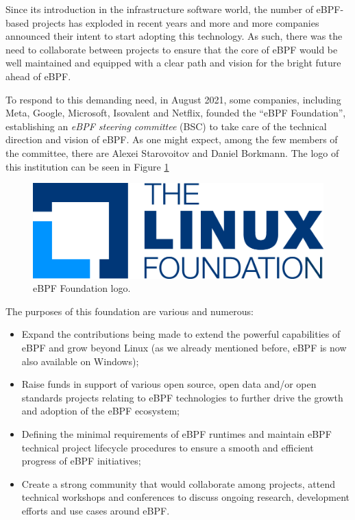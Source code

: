 Since its introduction in the infrastructure software world, the number of eBPF-based projects has exploded in recent years and more and more companies announced their intent to start adopting this technology.
As such, there was the need to collaborate between projects to ensure that the core of eBPF would be well maintained and equipped with a clear path and vision for the bright future ahead of eBPF.

To respond to this demanding need, in August 2021, some companies, including Meta, Google, Microsoft, Isovalent and Netflix, founded the ``eBPF Foundation'', establishing an \textit{eBPF steering committee} (BSC) to take care of the technical direction and vision of eBPF.
As one might expect, among the few members of the committee, there are Alexei Starovoitov and Daniel Borkmann.
The logo of this institution can be seen in Figure \ref{fig:eBPF_foundation_logo}

\begin{figure}[h]
	\centering
	\includegraphics[width=0.7\linewidth]{images/History/lf-stacked-color.png}
	\caption{eBPF Foundation logo.}
	\label{fig:eBPF_foundation_logo}
\end{figure}

The purposes of this foundation are various and numerous:

\begin{itemize}
	\item Expand the contributions being made to extend the powerful capabilities of
		eBPF and grow beyond Linux (as we already mentioned before, eBPF is now also available on Windows);
	\item Raise funds in support of various open source, open data and/or open
		standards projects relating to eBPF technologies to further drive the growth and adoption of the eBPF ecosystem;
	\item Defining the minimal requirements of eBPF runtimes and maintain eBPF
		technical project lifecycle procedures to ensure a smooth and efficient progress of eBPF initiatives;
	\item Create a strong community that would collaborate among projects, attend
		technical workshops and conferences to discuss ongoing research, development efforts and use cases around eBPF.
\end{itemize} 

